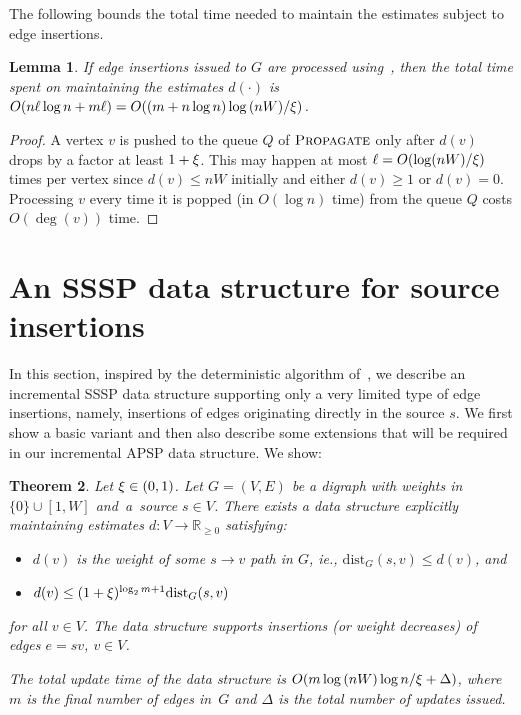 \documentclass[11pt,letterpaper]{article}
\theoremstyle{plain}
\newtheorem{theorem}{Theorem}[section]
\newtheorem{lemma}[theorem]{Lemma}
\newcommand{\dist}{\mathrm{dist}}
\DeclareMathOperator*{\PD}{\textsc{Propagate}}
\begin{document}
The following
bounds the total time needed to maintain the estimates subject to edge insertions.
\begin{lemma}\label{l:charge-decrease}
If edge insertions issued to $G$ are processed using~, then the total time spent on maintaining the estimates $d(\cdot)$ is $O(n\ell\log{n}+m\ell)=O((m+n\log{n})\log{(nW)}/\xi)$.
\end{lemma}
\begin{proof}
A vertex $v$ is pushed to the queue $Q$ of $\PD$ only after $d(v)$ drops by a factor at least $1+\xi$. This may happen at most $\ell=O(\log(nW)/\xi)$ times per vertex since $d(v)\leq nW$ initially and either $d(v)\geq 1$ or $d(v)=0$. Processing $v$ every time it is popped (in $O(\log{n})$ time) from the queue $Q$ costs $O(\deg(v))$ time.
\end{proof}

\section{An SSSP data structure for source insertions}\label{sec:source-insertions}
In this section, inspired by the deterministic algorithm of~\cite{KyngMG22}, we describe an incremental SSSP data structure supporting only a very limited type of edge insertions, namely, insertions of edges originating directly in the source $s$.
We first show a basic variant and then also describe some extensions that will be required in our incremental APSP data structure.
We show:
\begin{theorem}\label{t:source-sssp}
Let $\xi\in (0,1)$. Let $G=(V,E)$ be a digraph with weights in ${\{0\}\cup [1,W]}$ and~a~source $s\in V$. There exists a data structure explicitly maintaining estimates $d:V\to\mathbb{R}_{\geq 0}$ satisfying:
\begin{itemize}
  \item $d(v)$ is the weight of some $s\to v$ path in $G$, ie., $\dist_G(s,v)\leq d(v)$, and
  \item $d(v) \leq (1+\epsp)^{\log_2{m}+1}\dist_G(s,v)$
\end{itemize}
for all $v\in V$.
The data structure supports insertions (or weight decreases) of edges $e=sv$, $v\in V$.

The total update time of the data structure
is $O(m\log{(nW)}\log{n}/\xi+\Delta)$, where $m$ is the final number of edges in~$G$
and $\Delta$ is the total number of updates issued.
\end{theorem}
\end{document}
